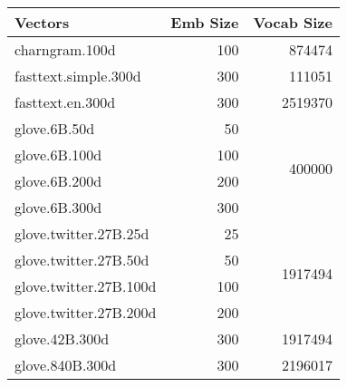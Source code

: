 \begin{tabular}{ l r r }
    \toprule
    
    \multicolumn{1}{l}{\textbf{Vectors}} &
    \multicolumn{1}{c}{\textbf{Emb Size}} &
    \multicolumn{1}{c}{\textbf{Vocab Size}} \\
    
    \midrule
    
    charngram.100d & 100 & \num{874474} \\
    
    \addlinespace
    
    fasttext.simple.300d & 300 & \num{111051} \\
    
    \addlinespace
    
    fasttext.en.300d & 300 & \num{2519370} \\
    
    \addlinespace
    
    glove.6B.50d  &  50 & \multirow{4}{*}{\num{400000}} \\
    glove.6B.100d & 100 &                               \\
    glove.6B.200d & 200 &                               \\
    glove.6B.300d & 300 &                               \\
    
    \addlinespace
    
    glove.twitter.27B.25d  &  25 & \multirow{4}{*}{\num{1917494}} \\
    glove.twitter.27B.50d  &  50 &                                \\
    glove.twitter.27B.100d & 100 &                                \\
    glove.twitter.27B.200d & 200 &                                \\
    
    \addlinespace
    
    glove.42B.300d & 300 & \num{1917494} \\
    
    \addlinespace
    
    glove.840B.300d & 300 & \num{2196017} \\
    
    \bottomrule
\end{tabular}
